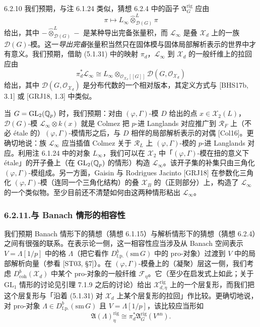 \begin{rem}{6.2.10}
我们预期，与注 6.1.24 类似，猜想 6.2.4 中的函子 $\mathfrak A^{\mathrm{rig}}_G$ 应由
\[
\pi\longmapsto L_\infty\widehat{\otimes}^L_{\mathcal D(G)}\pi
\]
给出，其中 $-\widehat{\otimes}^L_{\mathcal D(G)}-$ 是某种导出完备张量积，而 $\mathcal L_\infty$ 是叠 $\mathcal X_d$ 上的一族 $\mathcal D(G)$-模。这一\emph{导出完备}张量积当然只在固体模与固体局部解析表示的世界中才有意义。我们预期，借助 (5.1.31) 中的映射 $\pi_d$，$\mathcal L_\infty$ 到 $\mathcal X_d$ 的一般纤维上的拉回应由
\[
\pi_d^*\mathcal L_\infty\cong L_\infty\otimes_{\mathcal O_{\mathcal X_d}[[G]]}\mathcal D(G,\mathcal O_{\mathcal X_d})
\]
给出，其中 $\mathcal D(G,\mathcal O_{\mathcal X_d})$ 是分布代数的一个相对版本，其定义方式与 [BHS17b, 3.1] 或 [GRJ18, 1.3] 中类似。

当 $G=\mathrm{GL}_2(\mathbb{Q}_p)$ 时，我们预期：对由 $(\varphi,\Gamma)$-模 $D$ 给出的点 $x\in\mathcal X_2(L)$，$\mathcal D(G)$-模 $\mathcal L_\infty\otimes k(x)$ 就是 Colmez 把 $p$-进 Langlands 对应推广到 $\mathcal R_F$ 上（不必 étale 的）$(\varphi,\Gamma)$-模情形之后，与 $D$ 相伴的局部解析表示的对偶 [Col16]。更确切地说：族 $\mathcal L_\infty$ 应当插值 Colmez 关于 $\mathcal R_L$ 上 $(\varphi,\Gamma)$-模的 $p$-进 Langlands 对应。利用注 6.1.24 中的对象 $L_\infty$，我们可以在 $\mathcal X_2$ 中「$(\varphi,\Gamma)$-模在扭的意义下 étale」的开子叠上（在 $\mathrm{GL}_2(\mathbb{Q}_p)$ 的情形）构造 $\mathcal L_\infty$。该开子集的补集只由三角化 $(\varphi,\Gamma)$-模组成。另一方面，Gaisin 与 Rodrigues Jacinto [GRJ18] 在参数化三角化 $(\varphi,\Gamma)$-模（连同一个三角化结构）的叠 $\mathcal X_B$ 的（正则部分）上，构造了 $\mathcal L_\infty$ 的一个类似物。至少目前还不清楚如何由这两种情形粘出 $\mathcal L_\infty$。
\end{rem}

\subsubsection*{6.2.11.\quad 与 Banach 情形的相容性}

我们预期 Banach 情形下的猜想（猜想 6.1.15）与解析情形下的猜想（猜想 6.2.4）之间有很强的联系。在表示论一侧，这一相容性应当涉及从 Banach 空间表示 $V=\Lambda[1/p]$ 中的格 $\Lambda$（把它看作 $D^b_{\mathrm{f.p.}}(\mathrm{sm}\,G)$ 中的 pro-对象）过渡到 $V$ 中的局部解析向量（参看 [ST03, §7]）。在 $(\varphi,\Gamma)$-模叠上的（凝聚）层这一侧，我们考虑 $D^b_{\mathrm{coh}}(\mathcal X_d)$ 中某个 pro-对象的一般纤维 $\mathcal F_\eta$。它（至少在启发式上如此；关于 $\mathrm{GL}_1$ 情形的讨论见引理 7.1.9 之后的讨论）给出 $\mathcal X^{\mathrm{rig}}_{d,\eta}$ 上的一个层复形，而我们把这个层复形与「沿着 (5.1.31) 对 $\mathcal X_d$ 上某个层复形的拉回」作比较。更确切地说，对 pro-对象 $\Lambda\in D^b_{\mathrm{f.p.}}(\mathrm{sm}\,G)$ 且 $V=\Lambda[1/p]$，该比较应当形如
\begin{equation}\tag{6.2.12}\label{eq:a4-6-2-12}
\mathfrak A(\Lambda)^{\mathrm{rig}}_\eta\cong\pi_d^*\mathfrak A^{\mathrm{rig}}_G(V^{\mathrm{an}}).
\end{equation}

